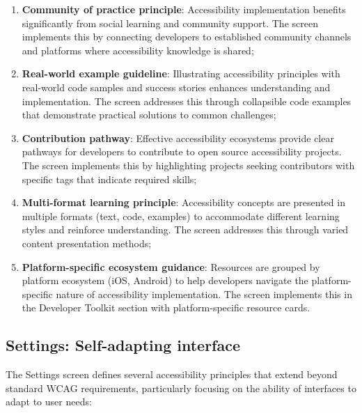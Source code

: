 \begin{enumerate}
    \item \textbf{Community of practice principle}: Accessibility implementation benefits significantly from social learning and community support. The screen implements this by connecting developers to established community channels and platforms where accessibility knowledge is shared;
    
    \item \textbf{Real-world example guideline}: Illustrating accessibility principles with real-world code samples and success stories enhances understanding and implementation. The screen addresses this through collapsible code examples that demonstrate practical solutions to common challenges;
    
    \item \textbf{Contribution pathway}: Effective accessibility ecosystems provide clear pathways for developers to contribute to open source accessibility projects. The screen implements this by highlighting projects seeking contributors with specific tags that indicate required skills;
    
    \item \textbf{Multi-format learning principle}: Accessibility concepts are presented in multiple formats (text, code, examples) to accommodate different learning styles and reinforce understanding. The screen addresses this through varied content presentation methods;
    
    \item \textbf{Platform-specific ecosystem guidance}: Resources are grouped by platform ecosystem (iOS, Android) to help developers navigate the platform-specific nature of accessibility implementation. The screen implements this in the Developer Toolkit section with platform-specific resource cards.
\end{enumerate}

\subsection{Settings: Self-adapting interface}

The Settings screen defines several accessibility principles that extend beyond standard WCAG requirements, particularly focusing on the ability of interfaces to adapt to user needs:

